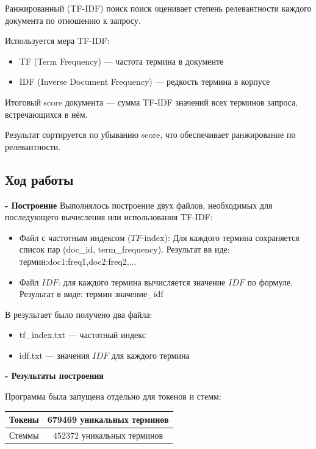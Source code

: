 \documentclass[pdf, unicode, 12pt, a4paper, oneside, fleqn]{article}
\begin{document}
Ранжированный (TF-IDF) поиск поиск оценивает степень релевантности каждого документа по отношению к запросу.

Используется мера TF-IDF:
\begin{itemize}
    \item TF (Term Frequency) — частота термина в документе
    \item IDF (Inverse Document Frequency) — редкость термина в корпусе
\end{itemize}
Итоговый score документа — сумма TF-IDF значений всех терминов запроса, встречающихся в нём.

Результат сортируется по убыванию score, что обеспечивает ранжирование по релевантности.

\subsection*{Ход работы}

\textbf{- Построение} 
Выполнялось построение двух файлов, необходимых для последующего вычисления или использования TF-IDF:

\begin{itemize}
    \item Файл с частотным индексом ($TF$-index): Для каждого термина сохраняется список пар (doc\_id, term\_frequency). Результат вв иде: термин:doc1:freq1,doc2:freq2,...
    \item Файл $IDF$: для каждого термина вычисляется значение $IDF$ по формуле. Результат в виде: термин значение\_idf
\end{itemize}

В результает было получено два файла:
\begin{itemize}
    \item tf\_index.txt — частотный индекс 
    \item idf.txt — значения $IDF$ для каждого термина
\end{itemize}

\textbf{- Результаты построения} 

Программа была запущена отдельно для токенов и стемм:

\begin{center}
\begin{tabular}{ |c|c| }
\hline
 Токены & 679469 уникальных терминов \\ 
 \hline
 Стеммы & 452372 уникальных терминов \\ 
 \hline
\end{tabular}
\end{center} 
\end{document}

